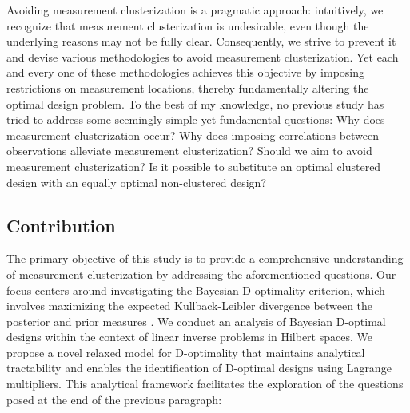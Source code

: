 Avoiding measurement clusterization is a pragmatic approach:
intuitively, we recognize that measurement clusterization is
undesirable, even though the underlying reasons may not be fully
clear. Consequently, we strive to prevent it and devise various
methodologies to avoid measurement clusterization. Yet each and every
one of these methodologies achieves this objective by imposing
restrictions on measurement locations, thereby fundamentally altering
the optimal design problem. To the best of my knowledge, no previous
study has tried to address some seemingly simple yet fundamental
questions:
%
Why does measurement clusterization occur?
%
Why does imposing correlations between observations alleviate
measurement clusterization?
%
Should we aim to avoid measurement clusterization?
%
Is it possible to substitute an optimal clustered design with an
equally optimal non-clustered design?


\subsection{Contribution}
The primary objective of this study is to provide a comprehensive
understanding of measurement clusterization by addressing the
aforementioned questions. Our focus centers around investigating the
Bayesian D-optimality criterion, which involves maximizing the
expected Kullback-Leibler divergence between the posterior and prior
measures \cite{CoverThomas91, Chaloner1995}. We conduct an analysis of
Bayesian D-optimal designs within the context of linear inverse
problems in Hilbert spaces. We propose a novel relaxed model for
D-optimality that maintains analytical tractability and enables the
identification of D-optimal designs using Lagrange multipliers. This
analytical framework facilitates the exploration of the questions
posed at the end of the previous paragraph:


